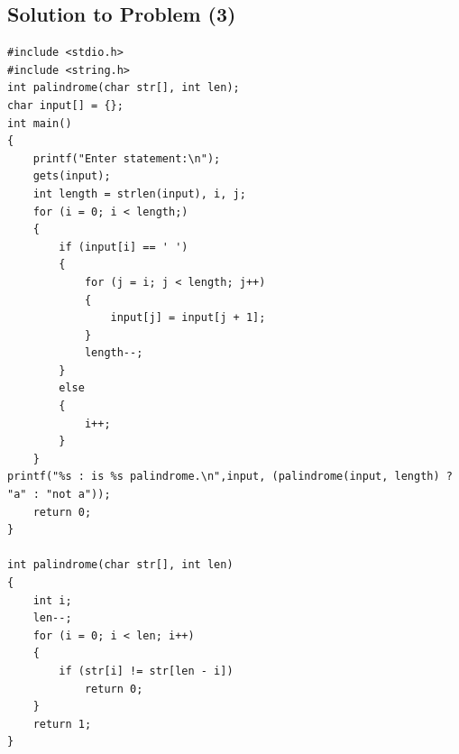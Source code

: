 \documentclass[a4paper,11pt]{article}
\theoremstyle{mytheor}
\theoremstyle{mytheor}
\begin{document}
\subsection{Solution to Problem (3)}
\begin{lstlisting}[label={list:third},title=Program's \texttt{C} code -- Uses out-of-bounds indexes and unsafe function \texttt{gets()}]
#include <stdio.h>
#include <string.h>
int palindrome(char str[], int len);
char input[] = {};
int main()
{
	printf("Enter statement:\n");
	gets(input);
	int length = strlen(input), i, j;
	for (i = 0; i < length;)
	{
		if (input[i] == ' ')
		{
			for (j = i; j < length; j++)
			{
				input[j] = input[j + 1];
			}
			length--;
		}
		else
		{
			i++;
		}
	}
printf("%s : is %s palindrome.\n",input, (palindrome(input, length) ? "a" : "not a"));
	return 0;
}

int palindrome(char str[], int len)
{
	int i;
	len--;
	for (i = 0; i < len; i++)
	{
		if (str[i] != str[len - i])
			return 0;
	}
	return 1;
}
\end{lstlisting}
\newpage
\end{document}
